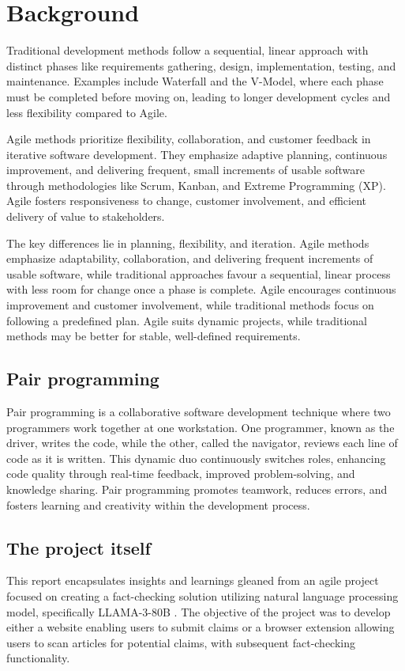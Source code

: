 \section{Background}
Traditional development methods follow a sequential, linear approach with distinct phases like requirements gathering, design, implementation, testing, and maintenance. Examples include Waterfall and the V-Model, where each phase must be completed before moving on, leading to longer development cycles and less flexibility compared to Agile.\cite{agile}

Agile methods prioritize flexibility, collaboration, and customer feedback in iterative software development. They emphasize adaptive planning, continuous improvement, and delivering frequent, small increments of usable software through methodologies like Scrum, Kanban, and Extreme Programming (XP). Agile fosters responsiveness to change, customer involvement, and efficient delivery of value to stakeholders. \cite{agile_3}

The key differences lie in planning, flexibility, and iteration. Agile methods emphasize adaptability, collaboration, and delivering frequent increments of usable software, while traditional approaches favour a sequential, linear process with less room for change once a phase is complete. Agile encourages continuous improvement and customer involvement, while traditional methods focus on following a predefined plan. Agile suits dynamic projects, while traditional methods may be better for stable, well-defined requirements.\cite{agile_2}

\subsection{Pair programming}
Pair programming is a collaborative software development technique where two programmers work together at one workstation. One programmer, known as the driver, writes the code, while the other, called the navigator, reviews each line of code as it is written. This dynamic duo continuously switches roles, enhancing code quality through real-time feedback, improved problem-solving, and knowledge sharing. Pair programming promotes teamwork, reduces errors, and fosters learning and creativity within the development process. \cite{pair} \cite{pair_2}


\subsection{The project itself}
This report encapsulates insights and learnings gleaned from an agile project focused on creating a fact-checking solution utilizing natural language processing model, specifically LLAMA-3-80B \cite{llama3}. The objective of the project was to develop either a website enabling users to submit claims or a browser extension allowing users to scan articles for potential claims, with subsequent fact-checking functionality. 

